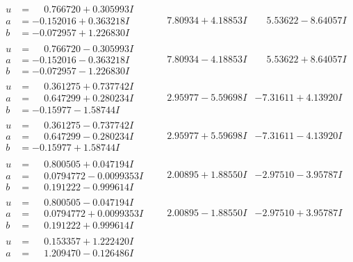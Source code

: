 \documentclass[1p]{elsarticle_modified}
\theoremstyle{definition}
\begin{document}
$$\begin{array}{c|c|c}
\begin{aligned}
u &= \phantom{-}0.766720 + 0.305993 I \\
a &= -0.152016 + 0.363218 I \\
b &= -0.072957 + 1.226830 I\end{aligned}
 & \phantom{-}7.80934 + 4.18853 I & \phantom{-}5.53622 - 8.64057 I \\ \hline\begin{aligned}
u &= \phantom{-}0.766720 - 0.305993 I \\
a &= -0.152016 - 0.363218 I \\
b &= -0.072957 - 1.226830 I\end{aligned}
 & \phantom{-}7.80934 - 4.18853 I & \phantom{-}5.53622 + 8.64057 I \\ \hline\begin{aligned}
u &= \phantom{-}0.361275 + 0.737742 I \\
a &= \phantom{-}0.647299 + 0.280234 I \\
b &= -0.15977 - 1.58744 I\end{aligned}
 & \phantom{-}2.95977 - 5.59698 I & -7.31611 + 4.13920 I \\ \hline\begin{aligned}
u &= \phantom{-}0.361275 - 0.737742 I \\
a &= \phantom{-}0.647299 - 0.280234 I \\
b &= -0.15977 + 1.58744 I\end{aligned}
 & \phantom{-}2.95977 + 5.59698 I & -7.31611 - 4.13920 I \\ \hline\begin{aligned}
u &= \phantom{-}0.800505 + 0.047194 I \\
a &= \phantom{-}0.0794772 - 0.0099353 I \\
b &= \phantom{-}0.191222 - 0.999614 I\end{aligned}
 & \phantom{-}2.00895 + 1.88550 I & -2.97510 - 3.95787 I \\ \hline\begin{aligned}
u &= \phantom{-}0.800505 - 0.047194 I \\
a &= \phantom{-}0.0794772 + 0.0099353 I \\
b &= \phantom{-}0.191222 + 0.999614 I\end{aligned}
 & \phantom{-}2.00895 - 1.88550 I & -2.97510 + 3.95787 I \\ \hline\begin{aligned}
u &= \phantom{-}0.153357 + 1.222420 I \\
a &= \phantom{-}1.209470 - 0.126486 I \\

\end{aligned}
\end{array}$$
\end{document}

